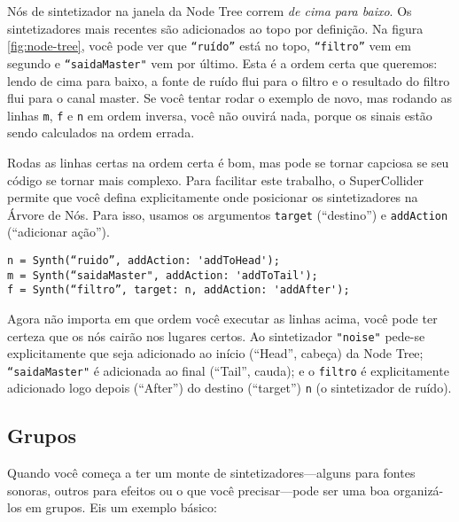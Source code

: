 Nós de sintetizador na janela da Node Tree correm \emph{de cima para baixo}. Os sintetizadores mais recentes são adicionados ao topo por definição. Na figura \ref{fig:node-tree}, você pode ver que  \texttt{“ruído”} está no topo, \texttt{“filtro”} vem em segundo e \texttt{“saidaMaster"} vem por último. Esta é a ordem certa que queremos: lendo de cima para baixo, a fonte de ruído flui para o filtro e o resultado do filtro flui para o canal master. Se você tentar rodar o exemplo de novo, mas rodando as linhas \texttt{m}, \texttt{f} e \texttt{n} em ordem inversa, você não ouvirá nada, porque os sinais estão sendo calculados na ordem errada.

Rodas as linhas certas na ordem certa é bom, mas pode se tornar capciosa se seu código se tornar mais complexo. Para facilitar este trabalho, o SuperCollider permite que você defina explicitamente onde posicionar os sintetizadores na Árvore de Nós. Para isso, usamos os argumentos \texttt{target} (“destino”) e \texttt{addAction} (“adicionar ação”).

\begin{lstlisting}[style=SuperCollider-IDE, basicstyle=\scttfamily\footnotesize]
n = Synth(“ruido”, addAction: 'addToHead');
m = Synth(“saidaMaster", addAction: 'addToTail');
f = Synth(“filtro”, target: n, addAction: 'addAfter');
\end{lstlisting}
Agora não importa em que ordem você executar as linhas acima, você pode ter certeza que os nós cairão nos lugares certos. Ao sintetizador \texttt{"noise"} pede-se explicitamente que seja adicionado ao início (“Head”, cabeça) da Node Tree; \texttt{“saidaMaster"} é adicionada ao final (“Tail”, cauda); e o \texttt{filtro} é explicitamente adicionado logo depois (“After”) do destino (“target”) \texttt{n} (o sintetizador de ruído).

\subsection{Grupos}

Quando você começa a ter um monte de sintetizadores---alguns para fontes sonoras, outros para efeitos ou o que você precisar---pode ser uma boa organizá-los em grupos. Eis um exemplo básico:

